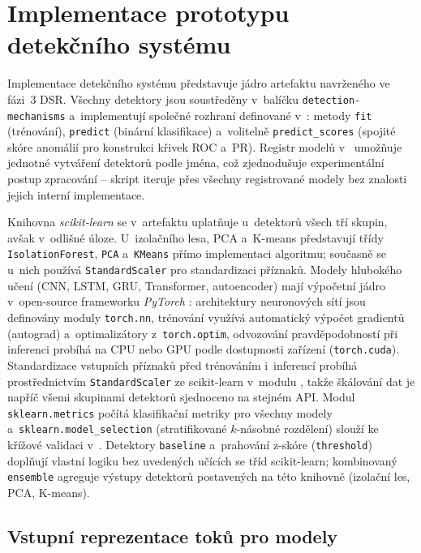 \section{Implementace prototypu detekčního systému}
\label{sec:implementace}

Implementace detekčního systému představuje jádro artefaktu navrženého ve fázi~3 DSR. Všechny detektory jsou soustředěny v~balíčku \texttt{detection-mechanisms} a~implementují společné rozhraní definované v~: metody \texttt{fit} (trénování), \texttt{predict} (binární klasifikace) a~volitelně \texttt{predict\_scores} (spojité skóre anomálií pro konstrukci křivek ROC a~PR).
Registr modelů v~ umožňuje jednotné vytváření detektorů podle jména, což zjednodušuje experimentální postup zpracování -- skript  iteruje přes všechny registrované modely bez znalosti jejich interní implementace.

Knihovna \emph{scikit-learn} \parencite{Pedregosa2011} se v~artefaktu uplatňuje u~detektorů všech tří skupin, avšak v~odlišné úloze. U~izolačního lesa, PCA a~K-means představují třídy \texttt{IsolationForest}, \texttt{PCA} a~\texttt{KMeans} přímo implementaci algoritmu; současně se u~nich používá \texttt{StandardScaler} pro standardizaci příznaků. Modely hlubokého učení (CNN, LSTM, GRU, Transformer, autoencoder) mají výpočetní jádro v~open-source frameworku \emph{PyTorch} \parencite{Paszke2019}: architektury neuronových sítí jsou definovány moduly \texttt{torch.nn}, trénování využívá automatický výpočet gradientů (autograd) a~optimalizátory z~\texttt{torch.optim}, odvozování pravděpodobností při inferenci probíhá na CPU nebo GPU podle dostupnosti zařízení (\texttt{torch.cuda}). Standardizace vstupních příznaků před trénováním i~inferencí probíhá prostřednictvím \texttt{StandardScaler} ze scikit-learn v~modulu , takže škálování dat je napříč všemi skupinami detektorů sjednoceno na stejném API. Modul \texttt{sklearn.metrics} počítá klasifikační metriky pro všechny modely a~\texttt{sklearn.model\_selection} (stratifikované $k$-násobné rozdělení) slouží ke křížové validaci v~. Detektory \texttt{baseline} a~prahování z-skóre (\texttt{threshold}) doplňují vlastní logiku bez uvedených učících se tříd scikit-learn; kombinovaný \texttt{ensemble} agreguje výstupy detektorů postavených na této knihovně (izolační les, PCA, K-means).

\subsection{Vstupní reprezentace toků pro modely}
\label{sec:predzpracovani}

